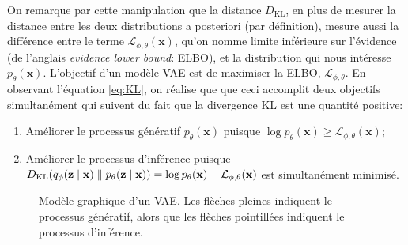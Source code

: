 On remarque par cette manipulation que la distance $D_{\mathrm{KL}}$, en plus de mesurer la distance entre 
les deux distributions a posteriori (par définition), mesure aussi la différence entre le terme 
$\mathcal{L}_{\phi,\theta}(\mathbf{x})$, qu'on nomme limite inférieure sur l'évidence (de l'anglais 
\textit{evidence lower bound}: ELBO), et la distribution qui nous intéresse $p_\theta(\mathbf{x})$. 
L'objectif d'un modèle VAE est de maximiser la ELBO, $\mathcal{L_{\phi,\theta}}$. 
En observant l'équation \eqref{eq:KL}, on réalise que 
que ceci accomplit deux objectifs simultanément qui suivent du fait que la divergence KL est 
une quantité positive:
\begin{enumerate}
        \item Améliorer le processus génératif $p_\theta(\mathbf{x})$ puisque $\log p_\theta(\mathbf{x}) \geq \mathcal{L}_{\phi,\theta}(\mathbf{x})$;
        \item Améliorer le processus d'inférence puisque 
        $D_{\mathrm{KL}}(q_\phi(\mathbf{z} \mid \mathbf{x}) \mathrel{\Vert}  p_\theta (\mathbf{z} \mid \mathbf{x})) = \log p_\theta(\mathbf{x}) - \mathcal{L}_{\phi,\theta}(\mathbf{x})$ est simultanément minimisé.
\end{enumerate}

\begin{figure}[H]
        \centering
        \caption{Modèle graphique d'un VAE. Les flèches pleines indiquent le processus génératif, alors que les flèches pointillées indiquent le processus d'inférence.}
        \label{fig:vae encoder}
\end{figure}

